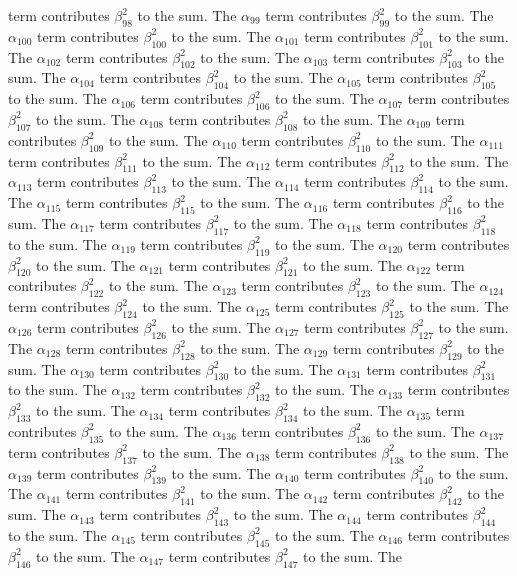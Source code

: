 \begin{lemma}
term contributes $\beta_{98}^{2}$ to the sum. The $\alpha_{99}$ term contributes $\beta_{99}^{2}$ to the sum. The $\alpha_{100}$ term contributes $\beta_{100}^{2}$ to the sum. The $\alpha_{101}$ term contributes $\beta_{101}^{2}$ to the sum. The $\alpha_{102}$ term contributes $\beta_{102}^{2}$ to the sum. The $\alpha_{103}$ term contributes $\beta_{103}^{2}$ to the sum. The $\alpha_{104}$ term contributes $\beta_{104}^{2}$ to the sum. The $\alpha_{105}$ term contributes $\beta_{105}^{2}$ to the sum. The $\alpha_{106}$ term contributes $\beta_{106}^{2}$ to the sum. The $\alpha_{107}$ term contributes $\beta_{107}^{2}$ to the sum. The $\alpha_{108}$ term contributes $\beta_{108}^{2}$ to the sum. The $\alpha_{109}$ term contributes $\beta_{109}^{2}$ to the sum. The $\alpha_{110}$ term contributes $\beta_{110}^{2}$ to the sum. The $\alpha_{111}$ term contributes $\beta_{111}^{2}$ to the sum. The $\alpha_{112}$ term contributes $\beta_{112}^{2}$ to the sum. The $\alpha_{113}$ term contributes $\beta_{113}^{2}$ to the sum. The $\alpha_{114}$ term contributes $\beta_{114}^{2}$ to the sum. The $\alpha_{115}$ term contributes $\beta_{115}^{2}$ to the sum. The $\alpha_{116}$ term contributes $\beta_{116}^{2}$ to the sum. The $\alpha_{117}$ term contributes $\beta_{117}^{2}$ to the sum. The $\alpha_{118}$ term contributes $\beta_{118}^{2}$ to the sum. The $\alpha_{119}$ term contributes $\beta_{119}^{2}$ to the sum. The $\alpha_{120}$ term contributes $\beta_{120}^{2}$ to the sum. The $\alpha_{121}$ term contributes $\beta_{121}^{2}$ to the sum. The $\alpha_{122}$ term contributes $\beta_{122}^{2}$ to the sum. The $\alpha_{123}$ term contributes $\beta_{123}^{2}$ to the sum. The $\alpha_{124}$ term contributes $\beta_{124}^{2}$ to the sum. The $\alpha_{125}$ term contributes $\beta_{125}^{2}$ to the sum. The $\alpha_{126}$ term contributes $\beta_{126}^{2}$ to the sum. The $\alpha_{127}$ term contributes $\beta_{127}^{2}$ to the sum. The $\alpha_{128}$ term contributes $\beta_{128}^{2}$ to the sum. The $\alpha_{129}$ term contributes $\beta_{129}^{2}$ to the sum. The $\alpha_{130}$ term contributes $\beta_{130}^{2}$ to the sum. The $\alpha_{131}$ term contributes $\beta_{131}^{2}$ to the sum. The $\alpha_{132}$ term contributes $\beta_{132}^{2}$ to the sum. The $\alpha_{133}$ term contributes $\beta_{133}^{2}$ to the sum. The $\alpha_{134}$ term contributes $\beta_{134}^{2}$ to the sum. The $\alpha_{135}$ term contributes $\beta_{135}^{2}$ to the sum. The $\alpha_{136}$ term contributes $\beta_{136}^{2}$ to the sum. The $\alpha_{137}$ term contributes $\beta_{137}^{2}$ to the sum. The $\alpha_{138}$ term contributes $\beta_{138}^{2}$ to the sum. The $\alpha_{139}$ term contributes $\beta_{139}^{2}$ to the sum. The $\alpha_{140}$ term contributes $\beta_{140}^{2}$ to the sum. The $\alpha_{141}$ term contributes $\beta_{141}^{2}$ to the sum. The $\alpha_{142}$ term contributes $\beta_{142}^{2}$ to the sum. The $\alpha_{143}$ term contributes $\beta_{143}^{2}$ to the sum. The $\alpha_{144}$ term contributes $\beta_{144}^{2}$ to the sum. The $\alpha_{145}$ term contributes $\beta_{145}^{2}$ to the sum. The $\alpha_{146}$ term contributes $\beta_{146}^{2}$ to the sum. The $\alpha_{147}$ term contributes $\beta_{147}^{2}$ to the sum. The 
\end{lemma}
